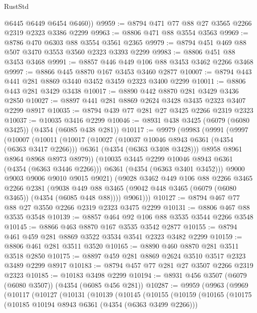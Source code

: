 \begin{lexlean}{RustStd}
\begin{coremodule}
        @6445
        @6449
        @6454
        @6460))
@9959 := @8794 @471 @77 @88 @27 @3565 @2266 @2319 @2323 @3386 @2299
@9963 := @8806 @471 @88 @3554 @3563
@9969 := @8786 @470 @6303 @88 @3554 @3561 @2365
@9979 := @8794 @451 @469 @88 @507 @3470 @3553 @3560 @2323 @3393 @2299
@9983 := @8806 @451 @88 @3453 @3468
@9991 := @8857 @446 @449 @106 @88 @3453 @3462 @2266 @3468
@9997 := @8866 @445 @8870 @167 @3453 @3460 @2877
@10007 := @8794 @443 @441 @281 @8869 @3440 @3452 @3459 @2323 @3400 @2299
@10011 := @8806 @443 @281 @3429 @3438
@10017 := @8890 @442 @8870 @281 @3429 @3436 @2850
@10027 := @8897 @441 @281 @8869 @2624 @3428 @3435 @2323 @3407 @2299 @8917
@10035 := @8794 @439 @77 @281 @27 @3425 @2266 @2319 @2323
@10037 := @10035 @3416 @2299
@10046 := @8931 @438 @3425 (@6079 (@6080 @3425)) (@4354 (@6085 @438 @281))
@10117 := @9979
    (@9983
      (@9991
        (@9997
          (@10007
            (@10011
              (@10017
                (@10027
                  (@10037 @10046 @8943 @6361 (@4354 (@6363 @3417 @2266)))
                  @6361
                  (@4354 (@6363 @3408 @3428)))
                @8958
                @8961
                @8964
                @8968
                @8973
                @8979))
            (@10035 @3445 @2299 @10046 @8943 @6361 (@4354 (@6363 @3446 @2266)))
            @6361
            (@4354 (@6363 @3401 @3452)))
          @9000
          @9003
          @9006
          @9010
          @9015
          @9021)
        (@9028
          @3462
          @449
          @106
          @88
          @2266
          @3465
          @2266
          @2381
          (@9038 @449 @88 @3465 (@9042 @448 @3465 (@6079 (@6080 @3465)) (@4354 (@6085 @448 @88))))
          @9061)))
@10127 := @8794 @467 @77 @88 @27 @3550 @2266 @2319 @2323 @3475 @2299
@10131 := @8806 @467 @88 @3535 @3548
@10139 := @8857 @464 @92 @106 @88 @3535 @3544 @2266 @3548
@10145 := @8866 @463 @8870 @167 @3535 @3542 @2877
@10155 := @8794 @461 @459 @281 @8869 @3522 @3534 @3541 @2323 @3482 @2299
@10159 := @8806 @461 @281 @3511 @3520
@10165 := @8890 @460 @8870 @281 @3511 @3518 @2850
@10175 := @8897 @459 @281 @8869 @2624 @3510 @3517 @2323 @3489 @2299 @8917
@10183 := @8794 @457 @77 @281 @27 @3507 @2266 @2319 @2323
@10185 := @10183 @3498 @2299
@10194 := @8931 @456 @3507 (@6079 (@6080 @3507)) (@4354 (@6085 @456 @281))
@10287 := @9959
    (@9963
      (@9969
        (@10117
          (@10127
            (@10131
              (@10139
                (@10145
                  (@10155
                    (@10159
                      (@10165
                        (@10175
                          (@10185 @10194 @8943 @6361 (@4354 (@6363 @3499 @2266)))

\end{coremodule}
\end{lexlean}
